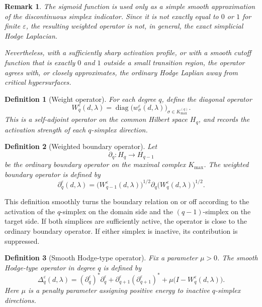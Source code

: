 \documentclass[10pt,a4paper]{amsart}
\newtheorem{remark}{Remark}%
\newtheorem{definition}{Definition}%
\begin{document}
\begin{remark}
The sigmoid function is used only as a simple smooth approximation of the
discontinuous simplex indicator. Since it is not exactly equal to \(0\) or \(1\)
for finite \(\varepsilon\), the resulting weighted operator is not, in general,
the exact simplicial Hodge Laplacian.

Nevertheless, with a sufficiently sharp activation profile, or with a smooth
cutoff function that is exactly \(0\) and \(1\) outside a small transition
region, the operator agrees with, or closely approximates, the ordinary Hodge
Laplian away from critical hypersurfaces.
\end{remark}

\begin{definition}[Weight operator]
For each degree \(q\), define the diagonal operator
\[
W_q^\varepsilon(d,\lambda)
=
\operatorname{diag}
\bigl(
w_\sigma^\varepsilon(d,\lambda)
\bigr)_{\sigma\in K_{\max}^{(q)}}.
\]
This is a self-adjoint operator on the common Hilbert space \(H_q\), and records
the activation strength of each \(q\)-simplex direction.
\end{definition}

\begin{definition}[Weighted boundary operator]
Let
\[
\partial_q:H_q\to H_{q-1}
\]
be the ordinary boundary operator on the maximal complex \(K_{\max}\). The
weighted boundary operator is defined by
\[
\partial_q^\varepsilon(d,\lambda)
=
\bigl(W_{q-1}^\varepsilon(d,\lambda)\bigr)^{1/2}
\partial_q
\bigl(W_q^\varepsilon(d,\lambda)\bigr)^{1/2}.
\]
\end{definition}

This definition smoothly turns the boundary relation on or off according to the
activation of the \(q\)-simplex on the domain side and the \((q-1)\)-simplex on
the target side. If both simplices are sufficiently active, the operator is close
to the ordinary boundary operator. If either simplex is inactive, its
contribution is suppressed.

\begin{definition}[Smooth Hodge-type operator]
Fix a parameter \(\mu>0\). The smooth Hodge-type operator in degree \(q\) is
defined by
\[
\Delta_q^\varepsilon(d,\lambda)
=
(\partial_q^\varepsilon)^\ast\partial_q^\varepsilon
+
\partial_{q+1}^\varepsilon(\partial_{q+1}^\varepsilon)^\ast
+
\mu\bigl(I-W_q^\varepsilon(d,\lambda)\bigr).
\]
Here \(\mu\) is a penalty parameter assigning positive energy to inactive
\(q\)-simplex directions.
\end{definition}
\end{document}

